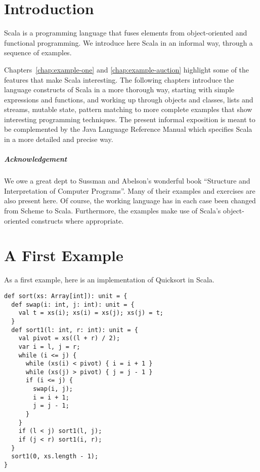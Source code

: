 \def\exercise{
   \def\theresult{Exercise~\thesection.\arabic{result}}
   \refstepcounter{result}
   \trivlist\item[\hskip
   \labelsep{\bf \theresult}]}
\def\endexercise{\endtrivlist}
 
\newcommand{\rewriteby}[1]{\mbox{\tab\tab\rm(#1)}}

\chapter{\label{chap:intro}Introduction}

Scala is a programming language that fuses elements from
object-oriented and functional programming. We introduce here Scala in
an informal way, through a sequence of examples.

Chapters~\ref{chap:example-one} and \ref{chap:example-auction}
highlight some of the features that make Scala interesting. The
following chapters introduce the language constructs of Scala in a
more thorough way, starting with simple expressions and functions, and
working up through objects and classes, lists and streams, mutable
state, pattern matching to more complete examples that show
interesting programming techniques. The present informal exposition is
meant to be complemented by the Java Language Reference Manual which
specifies Scala in a more detailed and precise way.

\paragraph{Acknowledgement}
We owe a great dept to Sussman and Abelson's wonderful book
``Structure and Interpretation of Computer
Programs''\cite{abelson-sussman:structure}. Many of their examples and
exercises are also present here. Of course, the working language has
in each case been changed from Scheme to Scala. Furthermore, the
examples make use of Scala's object-oriented constructs where
appropriate.

\chapter{\label{chap:example-one}A First Example}

As a first example, here is an implementation of Quicksort in Scala.

\begin{lstlisting}
def sort(xs: Array[int]): unit = {
  def swap(i: int, j: int): unit = {
    val t = xs(i); xs(i) = xs(j); xs(j) = t;
  }
  def sort1(l: int, r: int): unit = {
    val pivot = xs((l + r) / 2);
    var i = l, j = r;
    while (i <= j) {
      while (xs(i) < pivot) { i = i + 1 }
      while (xs(j) > pivot) { j = j - 1 }
      if (i <= j) { 
        swap(i, j);
        i = i + 1;
        j = j - 1;
      }
    } 
    if (l < j) sort1(l, j);
    if (j < r) sort1(i, r);
  }
  sort1(0, xs.length - 1);
}
\end{lstlisting}

